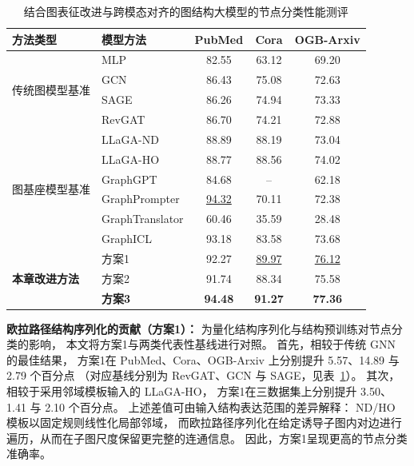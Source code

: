 \begin{table}[htbp]
  \centering
  \small
  \caption{结合图表征改进与跨模态对齐的图结构大模型的节点分类性能测评}
  \label{tab:node_cls_results}
  \setlength{\tabcolsep}{10pt}
  \renewcommand{\arraystretch}{1.2}
  \begin{tabular}{llccc}
    \toprule
    \textbf{方法类型} & \textbf{模型方法} & \textbf{PubMed} & \textbf{Cora} & \textbf{OGB-Arxiv} \\
    \midrule
    \multirow{4}{*}{传统图模型基准}
      & MLP      & 82.55 & 63.12 & 69.20 \\
      & GCN\cite{Kipf2016SemiSupervisedCW}      & 86.43 & 75.08 & 72.63 \\
      & SAGE\cite{Sun2021ScalableAA}    & 86.26 & 74.94 & 73.33 \\
      & RevGAT\cite{Li2024SimilaritybasedNS}    & 86.70 & 74.21 & 72.88 \\
    \midrule
    \multirow{6}{*}{图基座模型基准}
      & LLaGA-ND\cite{Chen2024LLaGALL} & 88.89 & 88.19 & 73.04 \\
      & LLaGA-HO\cite{Chen2024LLaGALL} & 88.77 & 88.56 & 74.02 \\
      & GraphGPT\cite{Tang2023GraphGPTGI} & 84.68 & -- & 62.18 \\
      & GraphPrompter\cite{Lv2025GraphPrompterMA} & \underline{94.32} & 70.11 & 72.38 \\
      & GraphTranslator\cite{Zhang2024GraphTranslatorAG} & 60.46 & 35.59 & 28.48 \\
      & GraphICL\cite{Sun2025GraphICLUG} & 93.18 & 83.58 & 73.68 \\
    \midrule
    \multirow{3}{*}{\textbf{本章改进方法}}
      & 方案1 & 92.27 & \underline{89.97} & \underline{76.12} \\
      & 方案2 & 91.74 & 88.34 & 75.58 \\
      & \textbf{方案3} & \textbf{94.48} & \textbf{91.27} & \textbf{77.36} \\
    \bottomrule
  \end{tabular}
\end{table}



\textbf{欧拉路径结构序列化的贡献（方案1）：}
为量化结构序列化与结构预训练对节点分类的影响，
本文将方案1与两类代表性基线进行对照。
首先，相较于传统 GNN 的最佳结果，
方案1在 PubMed、Cora、OGB-Arxiv 上分别提升 5.57、14.89 与 2.79 个百分点
（对应基线分别为 RevGAT、GCN 与 SAGE，见表~\ref{tab:node_cls_results}）。
其次，相较于采用邻域模板输入的 LLaGA-HO\cite{Chen2024LLaGALL}，
方案1在三数据集上分别提升 3.50、1.41 与 2.10 个百分点。
上述差值可由输入结构表达范围的差异解释：
ND/HO 模板以固定规则线性化局部邻域\cite{Chen2024LLaGALL}，
而欧拉路径序列化在给定诱导子图内对边进行遍历，从而在子图尺度保留更完整的连通信息。
因此，方案1呈现更高的节点分类准确率。


